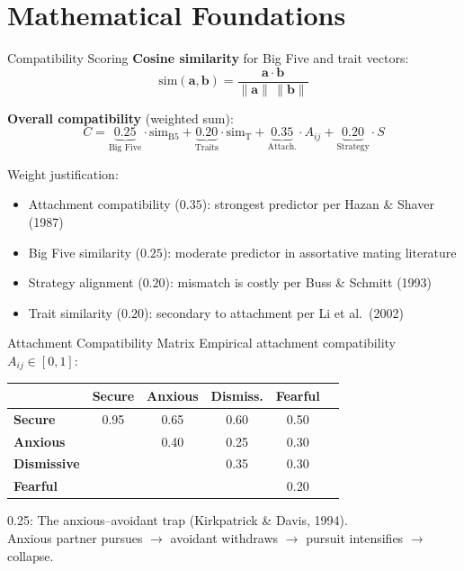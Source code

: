 \documentclass[aspectratio=169, 11pt]{beamer}
\begin{document}
\section{Mathematical Foundations}

\begin{frame}{Compatibility Scoring}
\textbf{Cosine similarity} for Big Five and trait vectors:
\[
\text{sim}(\mathbf{a}, \mathbf{b}) = \frac{\mathbf{a} \cdot \mathbf{b}}{\|\mathbf{a}\| \, \|\mathbf{b}\|}
\]

\textbf{Overall compatibility} (weighted sum):
\[
C = \underbrace{0.25}_{\text{Big Five}} \cdot \text{sim}_{\text{B5}} + \underbrace{0.20}_{\text{Traits}} \cdot \text{sim}_{\text{T}} + \underbrace{0.35}_{\text{Attach.}} \cdot A_{ij} + \underbrace{0.20}_{\text{Strategy}} \cdot S
\]

\vspace{0.5em}
\small
Weight justification:
\begin{itemize}
    \item Attachment compatibility ($0.35$): strongest predictor per Hazan \& Shaver (1987)
    \item Big Five similarity ($0.25$): moderate predictor in assortative mating literature
    \item Strategy alignment ($0.20$): mismatch is costly per Buss \& Schmitt (1993)
    \item Trait similarity ($0.20$): secondary to attachment per Li et al.\ (2002)
\end{itemize}
\end{frame}

\begin{frame}{Attachment Compatibility Matrix}
\small
Empirical attachment compatibility $A_{ij} \in [0, 1]$:

\vspace{0.5em}
\begin{tabular}{@{}lccccc@{}}
\toprule
 & \textbf{Secure} & \textbf{Anxious} & \textbf{Dismiss.} & \textbf{Fearful} \\
\midrule
\textbf{Secure}    & 0.95 & 0.65 & 0.60 & 0.50 \\
\textbf{Anxious}   &      & 0.40 & \alert{0.25} & 0.30 \\
\textbf{Dismissive} &     &      & 0.35 & 0.30 \\
\textbf{Fearful}   &      &      &      & 0.20 \\
\bottomrule
\end{tabular}

\vspace{1em}
\alert{0.25}: The anxious--avoidant trap (Kirkpatrick \& Davis, 1994).\\
Anxious partner pursues $\rightarrow$ avoidant withdraws $\rightarrow$ pursuit intensifies $\rightarrow$ collapse.
\end{frame}
\end{document}
